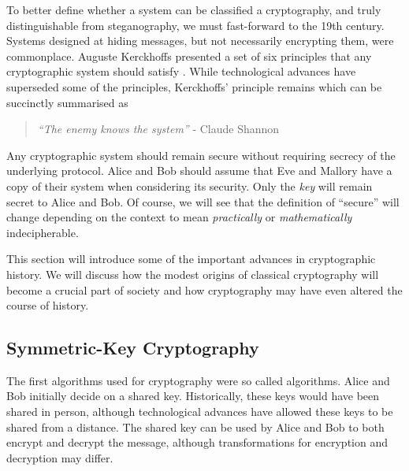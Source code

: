 
To better define whether a system can be classified a cryptography, and truly distinguishable from steganography, we must fast-forward to the 19th century. Systems designed at hiding messages, but not necessarily encrypting them, were commonplace. Auguste Kerckhoffs presented a set of six principles that any cryptographic system should satisfy \cite{KerckhoffsPrincple}. While technological advances have superseded some of the principles, Kerckhoffs' principle remains which can be succinctly summarised as

\begin{quote}
\centering
\textit{``The enemy knows the system''} - Claude Shannon \cite{shannon1949communication}
\end{quote}

Any cryptographic system should remain secure without requiring secrecy of the underlying protocol. Alice and Bob should assume that Eve and Mallory have a copy of their system when considering its security. Only the \textit{key} will remain secret to Alice and Bob. Of course, we will see that the definition of ``secure'' will change depending on the context to mean \textit{practically} or \textit{mathematically} indecipherable. 

This section will introduce some of the important advances in cryptographic history. We will discuss how the modest origins of classical cryptography will become a crucial part of society and how cryptography may have even altered the course of history.

\subsection{Symmetric-Key Cryptography}

The first algorithms used for cryptography were so called  algorithms. Alice and Bob initially decide on a shared key. Historically, these keys would have been shared in person, although technological advances have allowed these keys to be shared from a distance. The shared key can be used by Alice and Bob to both encrypt and decrypt the message, although transformations for encryption and decryption may differ.



